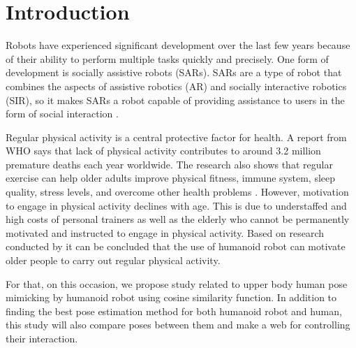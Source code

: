 \section{Introduction}
\label{sec:introduction}


Robots have experienced significant development over the last few years 
because of their ability to perform multiple tasks quickly and precisely.
One form of development is socially assistive robots (SARs). 
SARs are a type of robot that combines the aspects of assistive robotics (AR)
and socially interactive robotics (SIR), so it makes SARs a robot capable of providing assistance to users in the form of social interaction \citep{feil2005}.

Regular physical activity is a central protective factor for health.
A report from WHO says that lack of physical activity contributes to around 3.2 million premature deaths each year worldwide.
The research also shows that regular exercise can help older adults improve physical fitness, immune system, sleep quality, stress levels, and overcome other health problems \citep{lotfi2018}.
However, motivation to engage in physical activity declines with age. 
This is due to understaffed and high costs of personal trainers as well as the elderly who cannot be permanently motivated and instructed to engage in physical activity.
Based on research conducted by \citet{ruf2020} it can be concluded that the use of humanoid robot can motivate older people to carry out regular physical activity.

For that, on this occasion, we propose study related to upper body human pose mimicking by humanoid robot using cosine similarity function. 
In addition to finding the best pose estimation method for both humanoid robot and human, this study will also compare poses between them and make a web for controlling their interaction.
